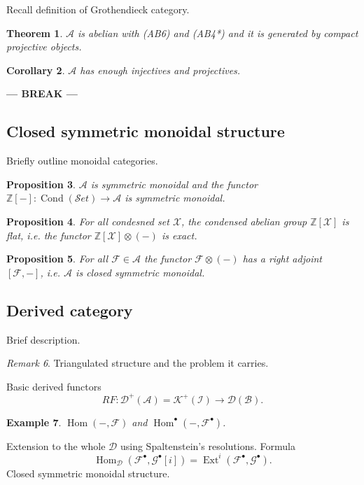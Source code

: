 \documentclass[12pt]{article}
\theoremstyle{darkgreentheorem}
\newtheorem{thm}{Theorem}[section]
\newtheorem{prop}[thm]{Proposition}
\newtheorem{cor}[thm]{Corollary}
\theoremstyle{darkbluedefinition}
\theoremstyle{darkredexample}
\newtheorem{exa}[thm]{Example}
\theoremstyle{remark}
\newtheorem{rem}[thm]{Remark}
\newcommand{\Z}{\mathbb{Z}}
\newcommand{\1}{\mathbbm{1}}
\newcommand{\A}{\mathscr{A}}
\newcommand{\Set}{\mathscr{S}et}
\newcommand{\D}{\mathscr{D}}
\newcommand{\K}{\mathscr{K}}
\newcommand{\F}{\mathcal{F}}
\newcommand{\G}{\mathcal{G}}
\newcommand{\X}{\mathcal{X}}
\DeclareMathOperator{\Hom}{Hom}
\DeclareMathOperator{\Ext}{Ext}
\DeclareMathOperator{\Cond}{Cond}
\newcommand{\ot}{\otimes}
\newcommand{\grd}{^{\bullet}}
\begin{document}
Recall definition of Grothendieck category.

\begin{thm}
    $\A$ is abelian with (AB6) and (AB4*) and it is generated by compact projective objects.
\end{thm}

\begin{cor}
    $\A$ has enough injectives and projectives.
\end{cor}

\begin{center}
    \textbf{--- BREAK ---}
\end{center}

\subsection{Closed symmetric monoidal structure}

Briefly outline monoidal categories.

\begin{prop}
    $\A$ is symmetric monoidal and the functor $\Z[-]\colon \Cond(\Set)\to \A$ is symmetric monoidal.
\end{prop}

\begin{prop}
    For all condesned set $\X$, the condensed abelian group $\Z[\X]$ is flat, i.e. the functor $\Z[\X]\ot (-)$ is exact.
\end{prop}

\begin{prop}
    For all $\F\in\A$ the functor $\F\ot(-)$ has a right adjoint $[\F,-]$, i.e. $\A$ is closed symmetric monoidal.
\end{prop}

\subsection{Derived category}

Brief description.

\begin{rem}
    Triangulated structure and the problem it carries.
\end{rem}

Basic derived functors
\[ RF\colon \D^{+}(\A)=\K^{+}(\mathcal{I})\to \D(\mathscr{B}). \]

\begin{exa}
    $\Hom(-,\F)$ and $\Hom\grd(-,\F\grd)$.
\end{exa}

Extension to the whole $\D$ using Spaltenstein's resolutions.
Formula
\[ \Hom_{\D}(\F\grd,\G\grd[i])=\Ext^{i}(\F\grd,\G\grd).\]
Closed symmetric monoidal structure.
\end{document}
